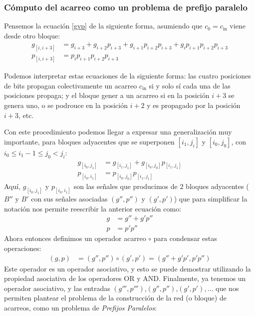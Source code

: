 \subsubsection{Cómputo del acarreo como un problema de prefijo paralelo}
Pensemos la ecuación \ref{gyp} de la siguiente forma, asumiendo que $c_0=c_\text{in}$ viene desde otro bloque:
\begin{equation}
\begin{align}
g_{[i,i+3]} &= g_{i+3}+g_{i+2}p_{i+3}+g_{i+1}p_{i+2}p_{i+3}+g_{i}p_{i+1}p_{i+2}p_{i+3}\nonumber\\
p_{[i,i+3]} &= p_{i}p_{i+1}p_{i+2}p_{i+3}\nonumber
\end{align}
\end{equation}

Podemos interpretar estas ecuaciones de la siguiente forma: las cuatro posiciones de bits propagan colectivamente un acarreo $c_\text{in}$ si y solo sí cada una de las posiciones propaga; y el bloque gener	a un acarreo si en la posición $i+3$ se genera uno, o se podrouce en la posición $i+2$ y es propagado por la posición $i+3$, etc.

Con este procedimiento podemos llegar a expresar una generalización muy importante, para bloques adyacentes que se superponen $[i_1,j_i]$ y $[i_0,j_0]$, con $i_0 \leq i_1 - 1 \leq j_0 < j_i $:
\begin{equation}
\begin{align}
g_{[i_0,j_1]} &= g_{[i_1,j_1]}+g_{[i_0,j_0]}p_{[i_1,j_1]} \nonumber\\
p_{[i_0,i_1]} &= p_{[i_0,j_0]}p_{[i_1,j_1]}\nonumber
\end{align}
\end{equation}
Aquí, $g_{[i_0,j_1]}$ y $p_{[i_0,i_1]}$ son las señales que producimos de 2 bloques adyacentes ($B''$ y $B'$ con sus señales asociadas $(g'',p'')$ y $(g',p')$) que para simplificar la notación nos permite reescribir la anterior ecuación como:
\begin{equation}
\begin{align}
g &= g'' + g'p''\nonumber\\
p &= p'p''\nonumber
\end{align}
\end{equation}
Ahora entonces definimos un operador acarreo $\circ$ para condensar estas operaciones:
\begin{equation}
\begin{align}
(g,p) &= (g'',p'') \circ (g',p') = (g'' + g'p', p'p'')\nonumber
\end{align}
\end{equation}
Este operador es un operador asociativo, y esto se puede demostrar utilizando la propiedad asociativa de los operadores OR y AND. Finalmente, ya tenemos un operador asociativo, y las entradas $(g''',p''')$,$(g'',p'')$,$(g',p'),\ldots$ que nos permiten plantear el problema de la construcción de la red (o bloque) de acarreos, como un problema de \emph{Prefijos Paralelos}:

